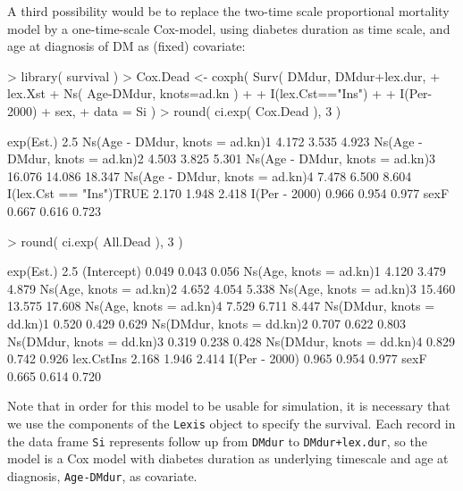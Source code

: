 \documentclass[a4paper,twoside,12pt]{report}
\begin{document}
A third possibility would be to replace the two-time scale
proportional mortality model by a one-time-scale Cox-model, using
diabetes duration as time scale, and age at diagnosis of DM as (fixed)
covariate:
\begin{Schunk}
\begin{Sinput}
> library( survival )
> Cox.Dead <- coxph( Surv( DMdur, DMdur+lex.dur,
+                          lex.Xst %in% c("Dead(Ins)","Dead")) ~
+                    Ns( Age-DMdur, knots=ad.kn ) +
+                    I(lex.Cst=="Ins") +
+                    I(Per-2000) + sex,
+                data = Si )
> round( ci.exp( Cox.Dead ), 3 )
\end{Sinput}
\begin{Soutput}
                                exp(Est.)   2.5%  97.5%
Ns(Age - DMdur, knots = ad.kn)1     4.172  3.535  4.923
Ns(Age - DMdur, knots = ad.kn)2     4.503  3.825  5.301
Ns(Age - DMdur, knots = ad.kn)3    16.076 14.086 18.347
Ns(Age - DMdur, knots = ad.kn)4     7.478  6.500  8.604
I(lex.Cst == "Ins")TRUE             2.170  1.948  2.418
I(Per - 2000)                       0.966  0.954  0.977
sexF                                0.667  0.616  0.723
\end{Soutput}
\begin{Sinput}
> round( ci.exp( All.Dead ), 3 )
\end{Sinput}
\begin{Soutput}
                          exp(Est.)   2.5%  97.5%
(Intercept)                   0.049  0.043  0.056
Ns(Age, knots = ad.kn)1       4.120  3.479  4.879
Ns(Age, knots = ad.kn)2       4.652  4.054  5.338
Ns(Age, knots = ad.kn)3      15.460 13.575 17.608
Ns(Age, knots = ad.kn)4       7.529  6.711  8.447
Ns(DMdur, knots = dd.kn)1     0.520  0.429  0.629
Ns(DMdur, knots = dd.kn)2     0.707  0.622  0.803
Ns(DMdur, knots = dd.kn)3     0.319  0.238  0.428
Ns(DMdur, knots = dd.kn)4     0.829  0.742  0.926
lex.CstIns                    2.168  1.946  2.414
I(Per - 2000)                 0.965  0.954  0.977
sexF                          0.665  0.614  0.720
\end{Soutput}
\end{Schunk}
Note that in order for this model to be usable for simulation, it is
necessary that we use the components of the \texttt{Lexis} object to
specify the survival. Each record in the data frame \texttt{Si}
represents follow up from \texttt{DMdur} to \texttt{DMdur+lex.dur}, so
the model is a Cox model with diabetes duration as underlying timescale
and age at diagnosis, \texttt{Age-DMdur}, as covariate.
\end{document}

